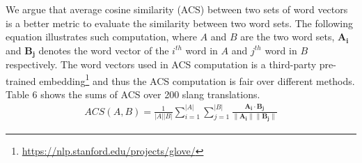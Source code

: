 We argue that average cosine similarity (ACS) between two sets of word vectors is a better metric to evaluate the similarity between two word sets. The following equation illustrates such computation, where $A$ and $B$ are the two word sets, $\mathbf{A_i}$ and $\mathbf{B_j}$ denotes the word vector of the $i^{th}$ word in $A$ and $j^{th}$ word in $B$ respectively. 
The word vectors used in ACS computation is a third-party pre-trained 
embedding\footnote{\url{https://nlp.stanford.edu/projects/glove/}} and thus the ACS computation is fair over different methods.
Table 6 shows the sums of ACS over 200 slang translations. 
\begin{align*}
ACS (A,B)=
{\frac{1}{|A||B|}}{\sum_{i=1}^{|A|}{\sum_{j=1}^{|B|}} \frac{\mathbf{A_i }\cdot \mathbf{B_j}}{\|\mathbf{A_i }\|\|\mathbf{B_j }\|}}
\end{align*}


